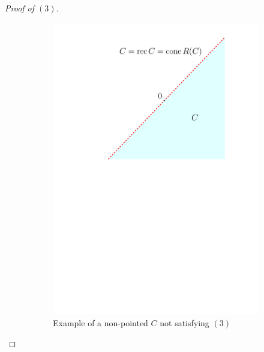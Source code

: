 \begin{proof}[Proof of \( (3) \)]
  \begin{figure}
    \centering
    \begin{subfigure}{.5\textwidth}
      \centering
      \includegraphics[scale=0.5]{figures/1697549641}
      \caption{Example of a non-pointed \( C \) not satisfying \( (3) \)}
    \end{subfigure}%
    \begin{subfigure}{.5\textwidth}
      \centering

\end{subfigure}
\end{figure}
\end{proof}
